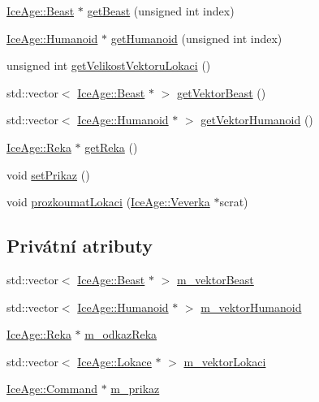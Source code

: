 \begin{DoxyCompactItemize}
\item 
\hyperlink{classIceAge_1_1Beast}{Ice\+Age\+::\+Beast} $\ast$ \hyperlink{classIceAge_1_1Lokace_a8aa0d127082ec0f09968909bb51341fd}{get\+Beast} (unsigned int index)
\item 
\hyperlink{classIceAge_1_1Humanoid}{Ice\+Age\+::\+Humanoid} $\ast$ \hyperlink{classIceAge_1_1Lokace_a5287730cae8f7c0e885dce5e1eee082e}{get\+Humanoid} (unsigned int index)
\item 
unsigned int \hyperlink{classIceAge_1_1Lokace_ad2c476dac4ae7832795995ed90fcc591}{get\+Velikost\+Vektoru\+Lokaci} ()
\item 
std\+::vector$<$ \hyperlink{classIceAge_1_1Beast}{Ice\+Age\+::\+Beast} $\ast$ $>$ \hyperlink{classIceAge_1_1Lokace_a7787ab3225a04df0c56c75d8ad0c41a1}{get\+Vektor\+Beast} ()
\item 
std\+::vector$<$ \hyperlink{classIceAge_1_1Humanoid}{Ice\+Age\+::\+Humanoid} $\ast$ $>$ \hyperlink{classIceAge_1_1Lokace_a829e2883345fb567d354a420b482fcf3}{get\+Vektor\+Humanoid} ()
\item 
\hyperlink{classIceAge_1_1Reka}{Ice\+Age\+::\+Reka} $\ast$ \hyperlink{classIceAge_1_1Lokace_a4171b0e935cabad5af993935c5cbfd55}{get\+Reka} ()
\item 
void \hyperlink{classIceAge_1_1Lokace_a27bac7797acadfebe3aaf61a69fdda2d}{set\+Prikaz} ()
\item 
void \hyperlink{classIceAge_1_1Lokace_a901ef2b29b32b8698115e8a2fe65df02}{prozkoumat\+Lokaci} (\hyperlink{classIceAge_1_1Veverka}{Ice\+Age\+::\+Veverka} $\ast$scrat)
\end{DoxyCompactItemize}
\subsection*{Privátní atributy}
\begin{DoxyCompactItemize}
\item 
std\+::vector$<$ \hyperlink{classIceAge_1_1Beast}{Ice\+Age\+::\+Beast} $\ast$ $>$ \hyperlink{classIceAge_1_1Lokace_a5dcb719c38dae7d7600a868bc40a0380}{m\+\_\+vektor\+Beast}
\item 
std\+::vector$<$ \hyperlink{classIceAge_1_1Humanoid}{Ice\+Age\+::\+Humanoid} $\ast$ $>$ \hyperlink{classIceAge_1_1Lokace_a777a6a3ae16e84b9843b9b18912014d2}{m\+\_\+vektor\+Humanoid}
\item 
\hyperlink{classIceAge_1_1Reka}{Ice\+Age\+::\+Reka} $\ast$ \hyperlink{classIceAge_1_1Lokace_a7b773f479641e323d55d1c935f238af4}{m\+\_\+odkaz\+Reka}
\item 
std\+::vector$<$ \hyperlink{classIceAge_1_1Lokace}{Ice\+Age\+::\+Lokace} $\ast$ $>$ \hyperlink{classIceAge_1_1Lokace_aa436a7cc7b4878f7c099f17b8874c852}{m\+\_\+vektor\+Lokaci}
\item 
\hyperlink{classIceAge_1_1Command}{Ice\+Age\+::\+Command} $\ast$ \hyperlink{classIceAge_1_1Lokace_a834dbd24600fee5d9962aa40564a8587}{m\+\_\+prikaz}
\end{DoxyCompactItemize}
